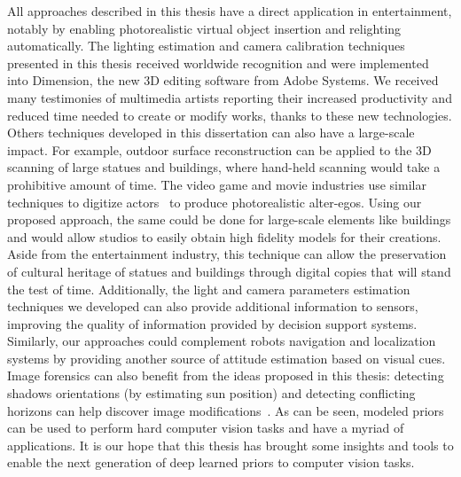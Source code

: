 All approaches described in this thesis have a direct application in entertainment, notably by enabling photorealistic virtual object insertion and relighting automatically. The lighting estimation and camera calibration techniques presented in this thesis received worldwide recognition and were implemented into Dimension, the new 3D editing software from Adobe Systems. We received many testimonies of multimedia artists reporting their increased productivity and reduced time needed to create or modify works, thanks to these new technologies. Others techniques developed in this dissertation can also have a large-scale impact. For example, outdoor surface reconstruction can be applied to the 3D scanning of large statues and buildings, where hand-held scanning would take a prohibitive amount of time. The video game and movie industries use similar techniques to digitize actors~\cite{debevec2000acquiring} to produce photorealistic alter-egos. Using our proposed approach, the same could be done for large-scale elements like buildings and would allow studios to easily obtain high fidelity models for their creations. Aside from the entertainment industry, this technique can allow the preservation of cultural heritage of statues and buildings through digital copies that will stand the test of time. Additionally, the light and camera parameters estimation techniques we developed can also provide additional information to sensors, improving the quality of information provided by decision support systems. Similarly, our approaches could complement robots navigation and localization systems by providing another source of attitude estimation based on visual cues. Image forensics can also benefit from the ideas proposed in this thesis: detecting shadows orientations (by estimating sun position) and detecting conflicting horizons can help discover image modifications~\cite{Farid2010}. As can be seen, modeled priors can be used to perform hard computer vision tasks and have a myriad of applications. It is our hope that this thesis has brought some insights and tools to enable the next generation of deep learned priors to computer vision tasks. 
